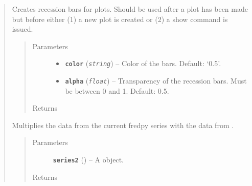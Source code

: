 \documentclass[letterpaper,10pt,english]{sphinxmanual}
\begin{document}
\begin{fulllineitems}
\begin{quote}

\begin{fulllineitems}
\label{series_class:fredpy.series.recessions}
Creates recession bars for plots. Should be used after a plot has been made but before either (1) a new plot is created or (2) a show command is issued.
\begin{quote}\begin{description}
\item[{Parameters}] \leavevmode\begin{itemize}
\item {} 
\textbf{\texttt{color}} (\emph{\texttt{string}}) -- Color of the bars. Default: `0.5'.

\item {} 
\textbf{\texttt{alpha}} (\emph{\texttt{float}}) -- Transparency of the recession bars. Must be between 0 and 1. Default: 0.5.

\end{itemize}

\item[{Returns}] \leavevmode


\end{description}\end{quote}

\end{fulllineitems}


\begin{fulllineitems}
\label{series_class:fredpy.series.times}
Multiplies the data from the current fredpy series with the data from .
\begin{quote}\begin{description}
\item[{Parameters}] \leavevmode
\textbf{\texttt{series2}} ({\hyperref[series_class:fredpy.series]{}}) -- A  object.

\item[{Returns}] \leavevmode
{\hyperref[series_class:fredpy.series]{}}

\end{description}\end{quote}


\end{fulllineitems}
\end{quote}
\end{fulllineitems}
\end{document}
